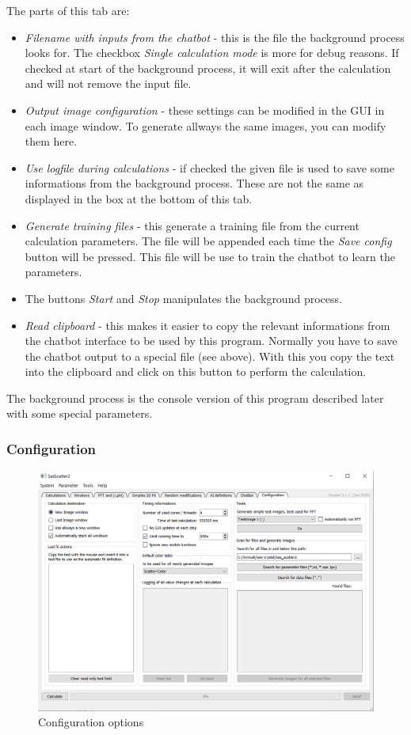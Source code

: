 \documentclass[11pt]{article} %
\begin{document}
The parts of this tab are:
\begin{itemize}\itemsep0pt
\item {\it Filename with inputs from the chatbot} - this is the file the background process looks for. The checkbox {\it Single calculation mode} is more for debug reasons. If checked at start of the background process, it will exit after the calculation and will  not remove the input file.
\item {\it Output image configuration} - these settings can be modified in the GUI in each image window. To generate allways the same images, you can modify them here.
\item {\it Use logfile during calculations} - if checked the given file is used to save some informations from the background process. These are not the same as displayed in the box at the bottom of this tab.
\item {\it Generate training files} - this generate a training file from the current calculation parameters. The file will be appended each time the {\it Save config} button will be pressed. This file will be use to train the chatbot to learn the parameters.
\item The buttons {\it Start} and {\it Stop} manipulates the background process.
\item {\it Read clipboard} - this makes it easier to copy the relevant informations from the chatbot interface to be used by this program. Normally you have to save the chatbot output to a special file (see above). With this you copy the text into the clipboard and click on this button to perform the calculation.
\end{itemize}
The background process is the console version of this program described later with some special parameters.



\subsubsection{Configuration}
\begin{figure}[H]
 \centering
 \includegraphics[width=\textwidth]{gui-config.png}
 \caption{Configuration options}
\end{figure}
\end{document}
